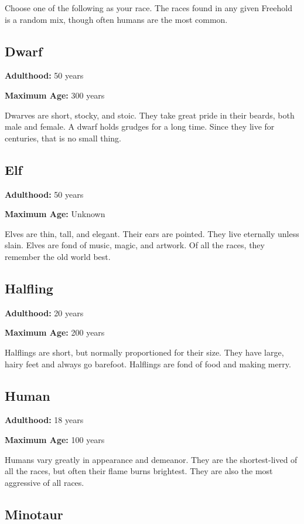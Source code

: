 \begin{multicols}{2}
Choose one of the following as your race. The races found in any given Freehold
is a random mix, though often humans are the most common.

\subsection{Dwarf}

\textbf{Adulthood:} 50 years

\textbf{Maximum Age:} 300 years

Dwarves are short, stocky, and stoic. They take great pride in their beards, both
male and female. A dwarf holds grudges for a long time. Since they live for
centuries, that is no small thing.

\subsection{Elf}

\textbf{Adulthood:} 50 years

\textbf{Maximum Age:} Unknown

Elves are thin, tall, and elegant. Their ears are pointed. They live eternally
unless slain. Elves are fond of music, magic, and artwork. Of all the races, they
remember the old world best.

\subsection{Halfling}

\textbf{Adulthood:} 20 years

\textbf{Maximum Age:} 200 years

Halflings are short, but normally proportioned for their size. They have
large, hairy feet and always go barefoot. Halflings are fond of food and making
merry.

\subsection{Human}

\textbf{Adulthood:} 18 years

\textbf{Maximum Age:} 100 years

Humans vary greatly in appearance and demeanor. They are the shortest-lived of
all the races, but often their flame burns brightest. They are also the most
aggressive of all races.

\subsection{Minotaur}


\end{multicols}

